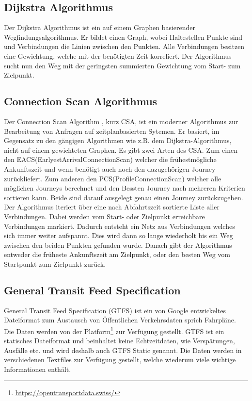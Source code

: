 \subsection{Dijkstra Algorithmus}
Der Dijkstra Algorithmus \cite{dij_bell} ist ein auf einem Graphen basierender Wegfindungsalgorithmus. Er bildet einen Graph, wobei Haltestellen Punkte sind und Verbindungen die Linien zwischen den Punkten. Alle Verbindungen besitzen eine Gewichtung, welche mit der benötigten Zeit korreliert. Der Algorithmus sucht nun den Weg mit der geringsten summierten Gewichtung vom Start- zum Zielpunkt.

\subsection{Connection Scan Algorithmus}
Der Connection Scan Algorithm \cite{csa} , kurz CSA,  ist ein moderner Algorithmus zur Bearbeitung von Anfragen auf zeitplanbasierten Sytemen. Er basiert, im Gegensatz zu den gängigen Algorithmen wie z.B. dem Dijkstra-Algorithmus, nicht auf einem gewichteten Graphen. 
Es gibt zwei Arten des CSA. Zum einen den EACS(EarlyestArrivalConnectionScan) welcher die frühestmögliche Ankunftszeit und wenn benötigt auch noch den dazugehörigen Journey zurückliefert. Zum anderen den PCS(ProfileConnectionScan) welcher alle möglichen Journeys berechnet und den Bessten Journey nach mehreren Kriterien sortieren kann. Beide sind darauf ausgelegt genau einen Journey zurückzugeben.
Der Algorithmus iteriert über eine nach Abfahrtszeit sortierte Liste aller Verbindungen. Dabei werden vom Start- oder Zielpunkt erreichbare Verbindungen markiert. Dadurch entsteht ein Netz aus Verbindungen welches sich immer weiter aufspannt. Dies wird dann so lange wiederholt bis ein Weg zwischen den beiden Punkten gefunden wurde. Danach gibt der Algorithmus entweder die früheste Ankunftszeit am Zielpunkt, oder den besten Weg vom Startpunkt zum Zielpunkt zurück.




 

\subsection{General Transit Feed Specification}
General Transit Feed Specification (GTFS) ist ein von Google entwickeltes Dateiformat zum Austausch von Öffentlichen Verkehrsdaten sprich Fahrpläne. Die Daten werden von der Platform\footnote{\url{https://opentransportdata.swiss/}} zur Verfügung gestellt. GTFS ist ein statisches Dateiformat und beinhaltet keine Echtzeitdaten, wie Verspätungen, Ausfälle etc. und wird deshalb auch GTFS Static genannt. Die Daten werden in verschiedenen Textfiles zur Verfügung gestellt, welche wiederum viele wichtige Informationen enthält.\newline

